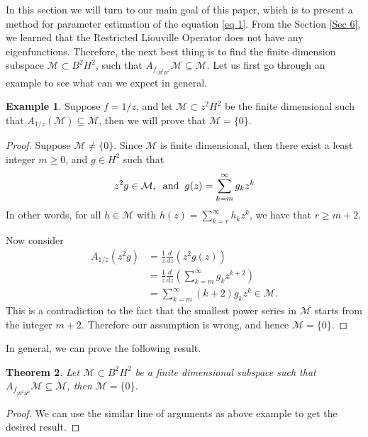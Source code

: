 \documentclass[preprint,12pt]{elsarticle} %
\theoremstyle{plain}
\newtheorem{theorem}{Theorem}[section]
\theoremstyle{definition}
\newtheorem{example}[theorem]{Example}
\theoremstyle{remark}
\begin{document}
In this section we will turn to our main goal of this paper, which is to present a method for parameter estimation of the equation \ref{eq 1}. From the Section \ref{Sec 6}, we learned that the Restricted Liouville Operator does not have any eigenfunctions. Therefore, the next best thing is to find the finite dimension subspace $\mathcal{M}\subset B^2H^2$, such that $A_{f_{|B^2 H^2}}\mathcal{M}\subseteq \mathcal{M}$. Let us first go through an example to see what can we expect in general. 

\begin{example}
    Suppose $f=1/z$, and let $\mathcal{M}\subset z^2H^2$ be the finite dimensional such that $A_{1/z}(\mathcal{M})\subseteq \mathcal{M}$, then we will prove that $\mathcal{M}=\{0\}$. 
\end{example}

\begin{proof}
    Suppose $\mathcal{M}\neq \{0\}$. Since $\mathcal{M}$ is finite dimensional, then there exist a least integer $m\geq 0$, and $g\in H^2$ such that 
    \[
z^2g\in \mathcal{M},\hspace{.2cm} \text{and}\hspace{.2cm}g(z)=\sum_{k=m}^{\infty}g_kz^k
\]
In other words, for all $h\in \mathcal{M}$ with $h(z)=\sum_{k=r}^{\infty}h_kz^k$, we have that $r\geq m+2$.

Now consider
\begin{align*}
    A_{1/z}(z^2g) &= \frac{1}{z}\frac{d}{dz}\left(z^2g(z)\right)\\
                  &= \frac{1}{z}\frac{d}{dz}\left(\sum_{k=m}^{\infty}g_kz^{k+2}\right)\\
                  &= \sum_{k=m}^{\infty}(k+2)g_kz^{k}\in \mathcal{M}.
\end{align*}
 This is a contradiction to the fact that the smallest power series in $\mathcal{M}$ starts from the integer $m+2$. Therefore our assumption is wrong, and hence $\mathcal{M}=\{0\}$.
\end{proof}

In general, we can prove the following result.

\begin{theorem}\label{Finite-dim}
    Let $\mathcal{M}\subset B^2H^2$ be a finite dimensional subspace such that $A_{f_{|B^2 H^2}}\mathcal{M}\subseteq \mathcal{M}$, then $\mathcal{M}=\{0\}$.
\end{theorem}
\begin{proof}
    We can use the similar line of arguments as above example to get the desired result.
\end{proof}
\end{document}

